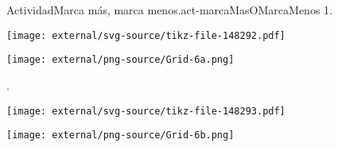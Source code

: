 \documentclass[20pt]{extarticle}
\begin{document}
\begin{activity}{Actividad}{Marca más, marca menos.}{act-marcaMasOMarcaMenos}%
1.%
\begin{image}{0}{1}{0}{}%
\texttt{[image: external/svg-source/tikz-file-148292.pdf]}
\end{image}%
\vspace*{1ex}
\begin{image}{0}{1}{0}{}%
\texttt{[image: external/png-source/Grid-6a.png]}
\end{image}%
.%
\begin{image}{0}{1}{0}{}%
\texttt{[image: external/svg-source/tikz-file-148293.pdf]}
\end{image}%
\vspace*{1ex}
\begin{image}{0}{1}{0}{}%
\texttt{[image: external/png-source/Grid-6b.png]}
\end{image}%
\end{activity}
\end{document}
